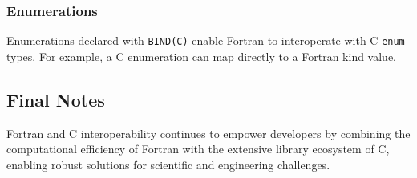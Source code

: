 \subsubsection{Enumerations}
Enumerations declared with \texttt{BIND(C)} enable Fortran to interoperate with C \texttt{enum} types. For example, a C enumeration can map directly to a Fortran kind value.

\subsection{Final Notes}
Fortran and C interoperability continues to empower developers by combining the computational efficiency of Fortran with the extensive library ecosystem of C, enabling robust solutions for scientific and engineering challenges.

\endinput  %